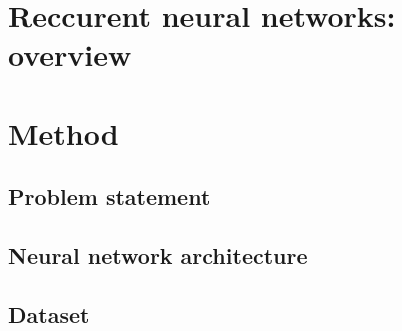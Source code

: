     
    
    
    
    

\section{Reccurent neural networks: overview}

\section{Method} \label{sec:method}
\subsection{Problem statement}
\subsection{Neural network architecture}
\subsection{Dataset}

